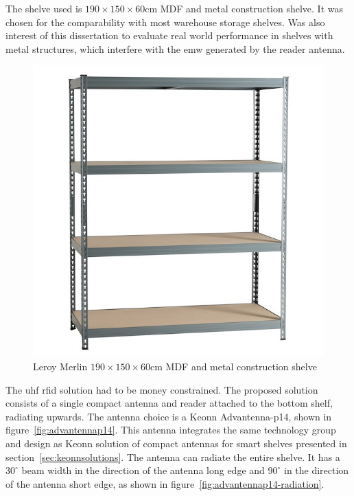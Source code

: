 The shelve used is $190\times150\times60$cm MDF and metal construction shelve. It was chosen for the comparability with most warehouse storage shelves. Was also interest of this dissertation to evaluate real world performance in shelves with metal structures, which interfere with the \ac{emw} generated by the reader antenna.

\begin{figure}
    \centering
    \includegraphics[width=0.6\linewidth]{./figs/estantedemetal.jpg}
    \caption{Leroy Merlin $190\times150\times60$cm MDF and metal construction shelve~\cite{EstanteMetalSpaceo}} 
    \label{fig:commercialshelve}
\end{figure}

The \ac{uhf} \ac{rfid} solution had to be money constrained. The proposed solution consists of a single compact antenna and reader attached to the bottom shelf, radiating upwards.
The antenna choice is a Keonn Advantenna-p14, shown in figure~\ref{fig:advantennap14}. This antenna integrates the same technology group and design as Keonn solution of compact antennas for smart shelves presented in section~\ref{sec:keonnsolutions}.
The antenna can radiate the entire shelve. It has a $30^{\circ}$ beam width in the direction of the antenna long edge and $90^{\circ}$ in the direction of the antenna short edge, as shown in figure~\ref{fig:advantennap14-radiation}.

